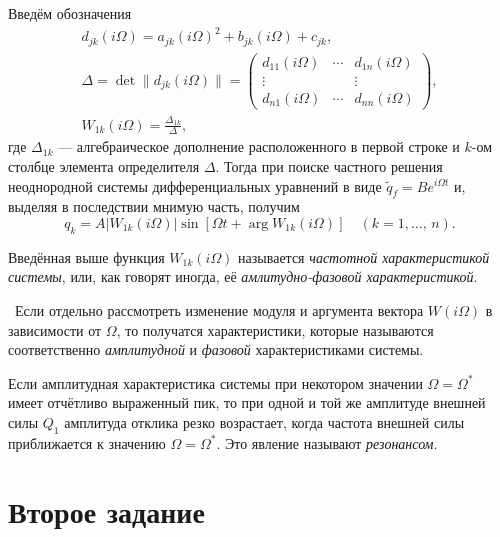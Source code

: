 \documentclass[a4paper]{article}
\begin{document}
Введём обозначения
\begin{gather*}
	d_{jk}(i\Omega)=a_{jk}(i\Omega)^2+b_{jk}(i\Omega)+c_{jk},\\
	\Delta=\det \|d_{jk}(i\Omega)\|=\begin{pmatrix} d_{11}(i\Omega) &
	\cdots & d_{1n}(i\Omega) \\ \vdots & & \vdots \\ d_{n1}(i\Omega) &
\cdots & d_{nn}(i\Omega)\end{pmatrix} ,\\
W_{1k}(i\Omega)=\frac{\Delta_{1k}}{\Delta},
\end{gather*}
где  $\Delta_{1k}$ --- алгебраическое дополнение расположенного в первой строке
и $k$-ом столбце  элемента определителя $\Delta$.
Тогда при поиске частного решения неоднородной системы дифференциальных уравнений
в виде $\tilde{q}_f=B e ^{i\Omega t}$ и, выделяя в последствии мнимую часть,
получим
\[
	q_k=A |W_{1k}(i\Omega)|\sin[\Omega t +\arg W_{1k}(i\Omega)]
	\quad (k=1,\ldots,\,n)
.\]
\begin{dfn}
	Введённая выше функция $W_{1k}(i\Omega)$ называется \emph{частотной
	характеристикой системы}, или, как говорят иногда, её
	\emph{амлитудно-фазовой
характеристикой}.
\end{dfn}
\begin{dfn}
	 Если отдельно рассмотреть изменение модуля и аргумента вектора
	$W(i\Omega)$ в зависимости от $\Omega$, то получатся характеристики,
	которые называются соответственно \emph{амплитудной} и \emph{фазовой}
	характеристиками системы.
\end{dfn}
\begin{dfn}
	Если амплитудная характеристика системы при некотором значении $\Omega=
	\Omega^*$ 
	имеет отчётливо выраженный пик, то при одной и той же амплитуде
	внешней силы $Q_1$ амплитуда отклика резко возрастает, когда частота
	внешней силы  приближается к значению $\Omega=\Omega^*$. Это явление
	называют \emph{резонансом}.
\end{dfn}
\section{Второе задание}
\end{document}
